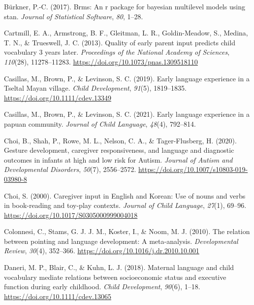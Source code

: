 \documentclass[
  english,
  man,floatsintext]{apa6}
\begin{document}
\leavevmode\hypertarget{ref-burkner2017brms}{}%
Bürkner, P.-C. (2017). Brms: An r package for bayesian multilevel models using stan. \emph{Journal of Statistical Software}, \emph{80}, 1--28.

\leavevmode\hypertarget{ref-cartmill_quality_2013}{}%
Cartmill, E. A., Armstrong, B. F., Gleitman, L. R., Goldin-Meadow, S., Medina, T. N., \& Trueswell, J. C. (2013). Quality of early parent input predicts child vocabulary 3 years later. \emph{Proceedings of the National Academy of Sciences}, \emph{110}(28), 11278--11283. \url{https://doi.org/10.1073/pnas.1309518110}

\leavevmode\hypertarget{ref-casillas_early_2019}{}%
Casillas, M., Brown, P., \& Levinson, S. C. (2019). Early language experience in a Tseltal Mayan village. \emph{Child Development}, \emph{91}(5), 1819--1835. \url{https://doi.org/10.1111/cdev.13349}

\leavevmode\hypertarget{ref-casillas2021early}{}%
Casillas, M., Brown, P., \& Levinson, S. C. (2021). Early language experience in a papuan community. \emph{Journal of Child Language}, \emph{48}(4), 792--814.

\leavevmode\hypertarget{ref-choi_gesture_2020}{}%
Choi, B., Shah, P., Rowe, M. L., Nelson, C. A., \& Tager-Flusberg, H. (2020). Gesture development, caregiver responsiveness, and language and diagnostic outcomes in infants at high and low risk for Autism. \emph{Journal of Autism and Developmental Disorders}, \emph{50}(7), 2556--2572. \url{https://doi.org/10.1007/s10803-019-03980-8}

\leavevmode\hypertarget{ref-choi_caregiver_2000}{}%
Choi, S. (2000). Caregiver input in English and Korean: Use of nouns and verbs in book-reading and toy-play contexts. \emph{Journal of Child Language}, \emph{27}(1), 69--96. \url{https://doi.org/10.1017/S0305000999004018}

\leavevmode\hypertarget{ref-colonnesi_relation_2010}{}%
Colonnesi, C., Stams, G. J. J. M., Koster, I., \& Noom, M. J. (2010). The relation between pointing and language development: A meta-analysis. \emph{Developmental Review}, \emph{30}(4), 352--366. \url{https://doi.org/10.1016/j.dr.2010.10.001}

\leavevmode\hypertarget{ref-daneri_maternal_2018}{}%
Daneri, M. P., Blair, C., \& Kuhn, L. J. (2018). Maternal language and child vocabulary mediate relations between socioeconomic status and executive function during early childhood. \emph{Child Development}, \emph{90}(6), 1--18. \url{https://doi.org/10.1111/cdev.13065}
\end{document}
